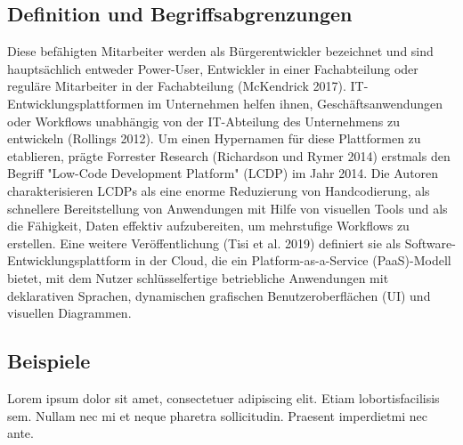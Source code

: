 \documentclass{article}
\begin{document}
	\subsection{Definition und Begriffsabgrenzungen}
	
	
	
	Diese befähigten Mitarbeiter werden als Bürgerentwickler bezeichnet und sind hauptsächlich entweder Power-User, Entwickler in einer Fachabteilung oder reguläre Mitarbeiter in der Fachabteilung (McKendrick 2017).
	IT-Entwicklungsplattformen im Unternehmen helfen ihnen, Geschäftsanwendungen oder Workflows unabhängig von der IT-Abteilung des Unternehmens zu entwickeln (Rollings 2012). 
	Um einen Hypernamen für diese Plattformen zu etablieren, prägte Forrester Research (Richardson und Rymer 2014) erstmals den Begriff "Low-Code Development Platform" (LCDP) im Jahr 2014. Die Autoren charakterisieren LCDPs als eine enorme Reduzierung von Handcodierung, als schnellere Bereitstellung von Anwendungen mit Hilfe von visuellen Tools und als die Fähigkeit, Daten effektiv aufzubereiten, um mehrstufige Workflows zu erstellen. 
	Eine weitere Veröffentlichung (Tisi et al. 2019) definiert sie als Software-Entwicklungsplattform in der Cloud, die ein Platform-as-a-Service (PaaS)-Modell bietet, mit dem Nutzer schlüsselfertige betriebliche Anwendungen mit deklarativen Sprachen, dynamischen grafischen Benutzeroberflächen (UI) und visuellen Diagrammen.
	
	\subsection{Beispiele}	
	Lorem  ipsum  dolor  sit  amet,  consectetuer  adipiscing  
	elit.   Etiam  lobortisfacilisis sem.  Nullam nec mi et 
	neque pharetra sollicitudin.  Praesent imperdietmi nec ante. 
	
\end{document}
